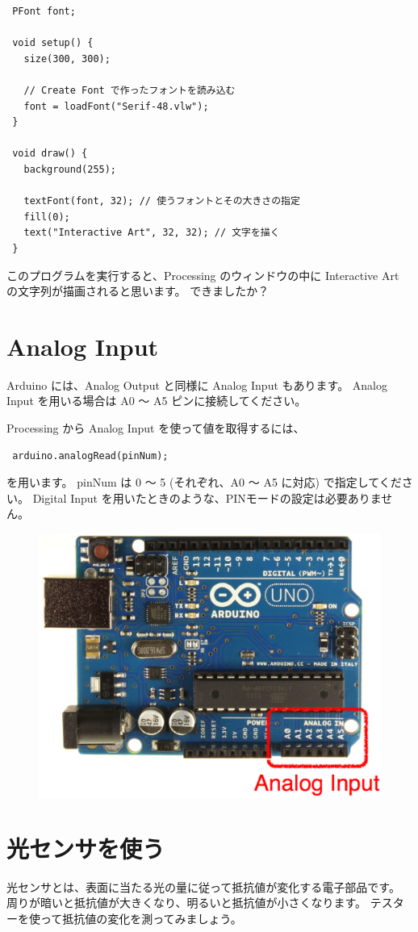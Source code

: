 \documentclass[11pt,a4paper]{jarticle}
\begin{document}

\begin{lstlisting}
 PFont font;

 void setup() {
   size(300, 300);

   // Create Font で作ったフォントを読み込む
   font = loadFont("Serif-48.vlw");
 }

 void draw() {
   background(255);

   textFont(font, 32); // 使うフォントとその大きさの指定
   fill(0);
   text("Interactive Art", 32, 32); // 文字を描く
 }
\end{lstlisting}
このプログラムを実行すると、Processing のウィンドウの中に Interactive Art の文字列が描画されると思います。
できましたか？

\newpage

\section{Analog Input}
Arduino には、Analog Output と同様に Analog Input もあります。
Analog Input を用いる場合は A0 〜 A5 ピンに接続してください。

Processing から Analog Input を使って値を取得するには、
\begin{lstlisting}
 arduino.analogRead(pinNum);
\end{lstlisting}
を用います。
pinNum は 0 〜 5 (それぞれ、A0 〜 A5 に対応) で指定してください。
Digital Input を用いたときのような、PINモードの設定は必要ありません。

\begin{figure}[h!]
 \centering
 \includegraphics[width=0.6\columnwidth]{img/analog_input_pins.eps}
\end{figure}

\section{光センサを使う}
光センサとは、表面に当たる光の量に従って抵抗値が変化する電子部品です。
周りが暗いと抵抗値が大きくなり、明るいと抵抗値が小さくなります。
テスターを使って抵抗値の変化を測ってみましょう。
\end{document}
